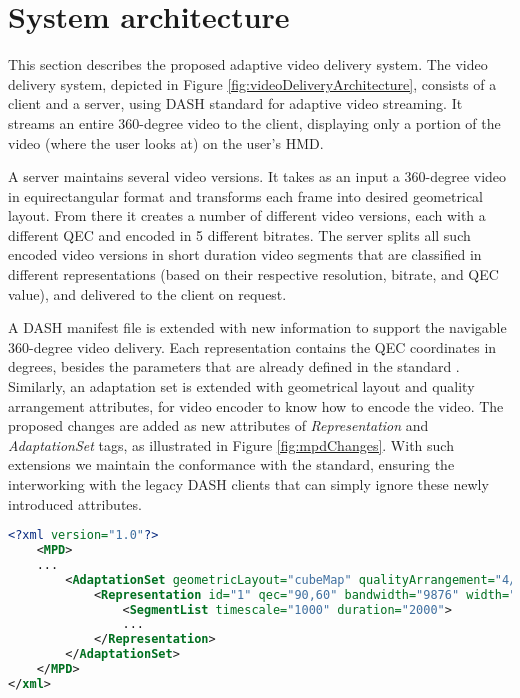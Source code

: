 \section{System architecture}

This section describes the proposed adaptive video delivery system. The video delivery system, depicted in Figure \ref{fig:videoDeliveryArchitecture}, consists of a client and a server, using DASH standard \cite{Stockhammer11} for adaptive video streaming. It streams an entire 360-degree video to the client, displaying only a portion of the video (where the user looks at) on the user's HMD.



A server maintains several video versions. It takes as an input a 360-degree video in equirectangular format and transforms each frame into desired geometrical layout. From there it creates a number of different video versions, each with a different QEC and encoded in 5 different bitrates. The server splits all such encoded video versions in short duration video segments that are classified in different representations (based on their respective resolution, bitrate, and QEC value), and delivered to the client on request.

A DASH manifest file is extended with new information to support the navigable 360-degree video delivery. Each representation contains the QEC coordinates in degrees, besides the parameters that are already defined in the standard \cite{}. Similarly, an adaptation set is extended with geometrical layout and quality arrangement attributes, for video encoder to know how to encode the video. The proposed changes are added as new attributes of \textit{Representation} and \textit{AdaptationSet} tags, as illustrated in Figure \ref{fig:mpdChanges}. With such extensions we maintain the conformance with the standard, ensuring the interworking with the legacy DASH clients that can simply ignore these newly introduced attributes.

\begin{lstlisting}[language=xml, frame=single, backgroundcolor=\color{white}, caption=Extensions of MPD file]
<?xml version="1.0"?>
    <MPD>
    ...
        <AdaptationSet geometricLayout="cubeMap" qualityArrangement="4/1/1">
            <Representation id="1" qec="90,60" bandwidth="9876" width="1920" height="1080" frameRate="30">
                <SegmentList timescale="1000" duration="2000">
                ...
            </Representation>
        </AdaptationSet>
    </MPD>
</xml>
\end{lstlisting}
\label{fig:mpdChanges}

